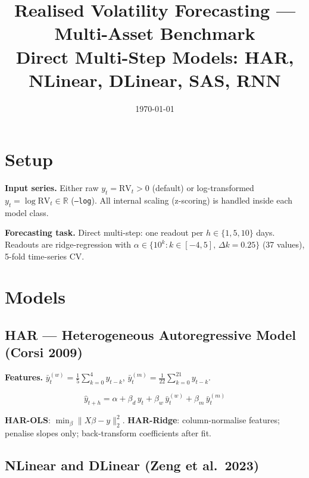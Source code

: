 \documentclass[11pt, a4paper]{article}
\title{\textbf{Realised Volatility Forecasting — Multi-Asset Benchmark}\\[4pt]
       \large Direct Multi-Step Models: HAR, NLinear, DLinear, SAS, RNN}
\author{}
\date{\today}
\newcommand{\RV}{\mathrm{RV}}
\begin{document}
\maketitle
\vspace{-1em}

\section{Setup}

\textbf{Input series.} Either raw $y_t = \RV_t > 0$ (default) or
log-transformed $y_t = \log\RV_t \in \mathbb{R}$ (\texttt{--log}).
All internal scaling (z-scoring) is handled inside each model class.

\textbf{Forecasting task.} Direct multi-step: one readout per
$h \in \{1,5,10\}$ days.  Readouts are ridge-regression with
$\alpha \in \{10^k : k \in [-4,5],\,\Delta k{=}0.25\}$ (37 values),
5-fold time-series CV.

\section{Models}

\subsection{HAR — Heterogeneous Autoregressive Model (Corsi 2009)}

\textbf{Features.} $\bar{y}^{(w)}_t = \tfrac{1}{5}\sum_{k=0}^{4}y_{t-k}$,\quad
$\bar{y}^{(m)}_t = \tfrac{1}{22}\sum_{k=0}^{21}y_{t-k}$.

\begin{equation}
  \hat{y}_{t+h} = \alpha + \beta_d\,y_t + \beta_w\,\bar{y}^{(w)}_t
                         + \beta_m\,\bar{y}^{(m)}_t
\end{equation}

\textbf{HAR-OLS}: $\min_\beta \|X\beta - y\|_2^2$.\quad
\textbf{HAR-Ridge}: column-normalise features; penalise slopes only;
back-transform coefficients after fit.

\subsection{NLinear and DLinear (Zeng et al.\ 2023)}
\end{document}
